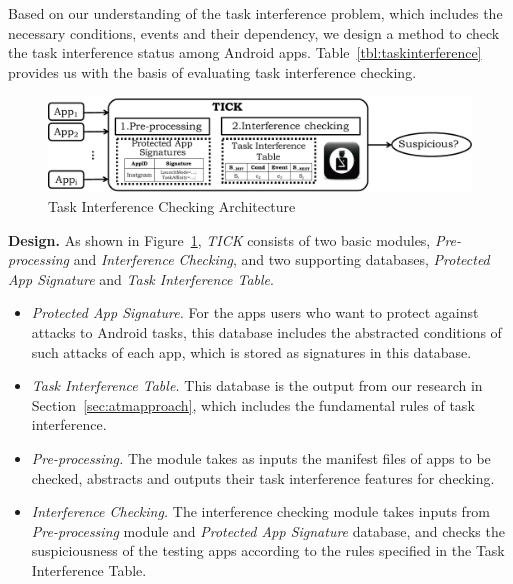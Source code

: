 \documentclass[letterpaper,12pt]{article}
\begin{document}
Based on our understanding of the task interference problem, which
includes the necessary conditions, events and their dependency, we
design a method to check the task interference status among Android
apps.  Table~\ref{tbl:taskinterference} provides us with the basis of
evaluating task interference checking.

\begin{figure}[t]
        \centering
                \includegraphics[width=\linewidth]{tick.pdf}
           \caption{Task Interference Checking Architecture}
           \vspace{-0.2cm}
        \label{fig:tick}
\end{figure}

\textbf{Design.} As shown in Figure~\ref{fig:tick}, \textsl{TICK}
consists of two basic modules, \textsl{Pre-processing} and
\textsl{Interference Checking}, and two supporting databases,
\textsl{Protected App Signature} and \textsl{Task Interference Table}.

\begin{itemize}
\item \textsl{Protected App Signature.} For the apps users who want to
  protect against attacks to Android tasks, this database includes the
  abstracted conditions of such attacks of each app, which is stored as
  signatures in this database.
\item \textsl{Task Interference Table.} This database is the output
  from our research in Section~\ref{sec:atmapproach}, which includes the
  fundamental rules of task interference.
\item \textsl{Pre-processing.} The module takes as inputs the manifest
  files of apps to be checked, abstracts and outputs their task
  interference features for checking.
\item \textsl{Interference Checking.} The interference checking module
  takes inputs from \textsl{Pre-processing} module and \textsl{Protected App
  Signature} database, and checks the suspiciousness of the testing apps
  according to the rules specified in the Task Interference Table.
\end{itemize}
\end{document}
